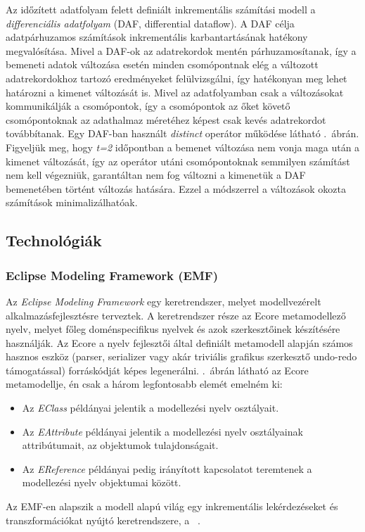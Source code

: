 Az időzített adatfolyam felett definiált inkrementális számítási modell a \emph{differenciális adatfolyam} (DAF, differential dataflow). A DAF célja adatpárhuzamos számítások inkrementális karbantartásának hatékony megvalósítása. Mivel a DAF-ok az adatrekordok mentén párhuzamosítanak, így a bemeneti adatok változása esetén minden csomópontnak elég a változott adatrekordokhoz tartozó eredményeket felülvizsgálni, így hatékonyan meg lehet határozni a kimenet változását is. Mivel az adatfolyamban csak a változásokat kommunikálják a csomópontok, így a csomópontok az őket követő csomópontoknak az adathalmaz méretéhez képest csak kevés adatrekordot továbbítanak. Egy DAF-ban használt \emph{distinct} operátor működése látható .~ábrán. Figyeljük meg, hogy \emph{t=2} időpontban a bemenet változása nem vonja maga után a kimenet változását, így az operátor utáni csomópontoknak semmilyen számítást nem kell végezniük, garantáltan nem fog változni a kimenetük a DAF bemenetében történt változás hatására. Ezzel a módszerrel a változások okozta számítások minimalizálhatóak.

 
\subsection{Technológiák}
 
\subsubsection{Eclipse Modeling Framework (EMF)}

Az \emph{Eclipse Modeling Framework} egy keretrendszer, melyet modellvezérelt alkalmazásfejlesztésre terveztek. A keretrendszer része az Ecore metamodellező nyelv, melyet főleg doménspecifikus nyelvek és azok szerkesztőinek készítésére használják. Az Ecore a nyelv fejlesztői által definiált metamodell alapján számos hasznos eszköz (parser, serializer vagy akár triviális grafikus szerkesztő undo-redo támogatással) forráskódját képes legenerálni. .~ábrán látható az Ecore metamodellje, én csak a három legfontosabb elemét emelném ki:
\begin{itemize}
	\item Az \emph{EClass} példányai jelentik a modellezési nyelv osztályait.
	\item Az \emph{EAttribute} példányai jelentik a modellezési nyelv osztályainak attribútumait, az objektumok tulajdonságait.
	\item Az \emph{EReference} példányai pedig irányított kapcsolatot teremtenek a modellezési nyelv objektumai között.
\end{itemize}
Az EMF-en alapszik a modell alapú világ egy inkrementális lekérdezéseket és transzformációkat nyújtó keretrendszere, a \viatra~\cite{DBLP:journals/sosym/VarroBHHRU16}.

